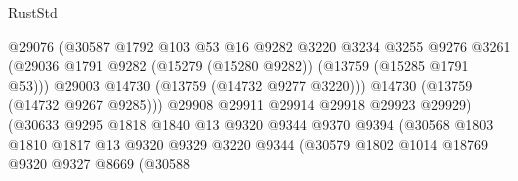 \begin{lexlean}{RustStd}
\begin{coremodule}
                                        @29076
                                        (@30587
                                          @1792
                                          @103
                                          @53
                                          @16
                                          @9282
                                          @3220
                                          @3234
                                          @3255
                                          @9276
                                          @3261
                                          (@29036
                                            @1791
                                            @9282
                                            (@15279 (@15280 @9282))
                                            (@13759 (@15285 @1791 @53)))
                                          @29003
                                          @14730
                                          (@13759 (@14732 @9277 @3220)))
                                        @14730
                                        (@13759 (@14732 @9267 @9285)))
                                      @29908
                                      @29911
                                      @29914
                                      @29918
                                      @29923
                                      @29929)
                                    (@30633
                                      @9295
                                      @1818
                                      @1840
                                      @13
                                      @9320
                                      @9344
                                      @9370
                                      @9394
                                      (@30568
                                        @1803
                                        @1810
                                        @1817
                                        @13
                                        @9320
                                        @9329
                                        @3220
                                        @9344
                                        (@30579
                                          @1802
                                          @1014
                                          @18769
                                          @9320
                                          @9327
                                          @8669
                                          (@30588

\end{coremodule}
\end{lexlean}
